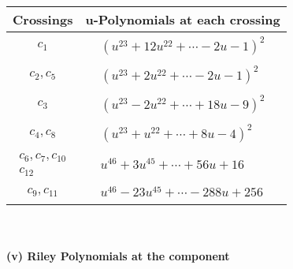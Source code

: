 \documentclass[1p]{elsarticle_modified}
\theoremstyle{definition}
\begin{document}
\begin{tabular}{m{50pt}|m{274pt}}
Crossings & \hspace{64pt}u-Polynomials at each crossing \\
\hline $$\begin{aligned}c_{1}\end{aligned}$$&$\begin{aligned}
&(u^{23}+12 u^{22}+\cdots-2 u-1)^{2}
\end{aligned}$\\
\hline $$\begin{aligned}c_{2},c_{5}\end{aligned}$$&$\begin{aligned}
&(u^{23}+2 u^{22}+\cdots-2 u-1)^{2}
\end{aligned}$\\
\hline $$\begin{aligned}c_{3}\end{aligned}$$&$\begin{aligned}
&(u^{23}-2 u^{22}+\cdots+18 u-9)^{2}
\end{aligned}$\\
\hline $$\begin{aligned}c_{4},c_{8}\end{aligned}$$&$\begin{aligned}
&(u^{23}+u^{22}+\cdots+8 u-4)^{2}
\end{aligned}$\\
\hline $$\begin{aligned}c_{6},c_{7},c_{10}\\c_{12}\end{aligned}$$&$\begin{aligned}
&u^{46}+3 u^{45}+\cdots+56 u+16
\end{aligned}$\\
\hline $$\begin{aligned}c_{9},c_{11}\end{aligned}$$&$\begin{aligned}
&u^{46}-23 u^{45}+\cdots-288 u+256
\end{aligned}$\\
\hline
\end{tabular}\\~\\
\newpage\renewcommand{\arraystretch}{1}
\flushleft \textbf{(v) Riley Polynomials at the component}\newline \\
\end{document}
